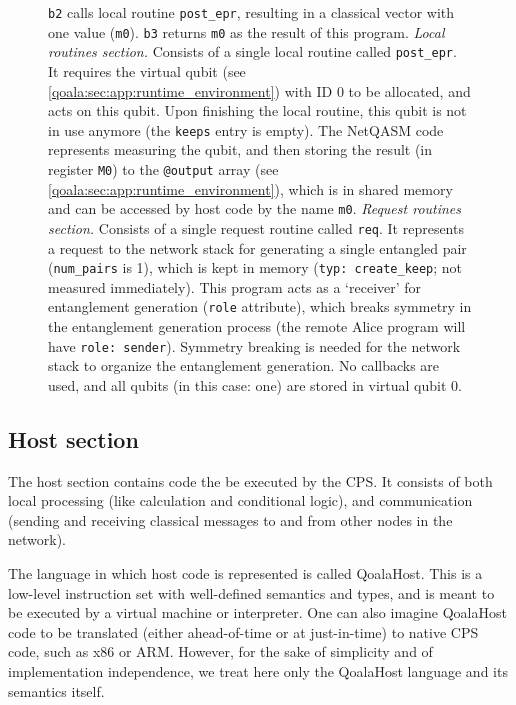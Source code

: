 \begin{figure}[ht]
{    \texttt{b2} calls local routine \texttt{post\_epr}, resulting in a classical vector with one value (\texttt{m0}).
    \texttt{b3} returns \texttt{m0} as the result of this program.
    \textit{Local routines section.} Consists of a single local routine called \texttt{post\_epr}.
    It requires the virtual qubit (see \cref{qoala:sec:app:runtime_environment}) with ID 0 to be allocated, and acts on this qubit.
    Upon finishing the local routine, this qubit is not in use anymore (the \texttt{keeps} entry is empty).
    The NetQASM code represents measuring the qubit, and then storing the result (in register \texttt{M0}) to the \texttt{@output} array (see \cref{qoala:sec:app:runtime_environment}), which is in shared memory and can be accessed by host code by the name \texttt{m0}.
    \textit{Request routines section.} Consists of a single request routine called \texttt{req}.
    It represents a request to the network stack for generating a single entangled pair (\texttt{num\_pairs} is 1), which is kept in memory (\texttt{typ: create\_keep}; not measured immediately).
    This program acts as a `receiver' for entanglement generation (\texttt{role} attribute), which breaks symmetry in the entanglement generation process (the remote Alice program will have \texttt{role: sender}). Symmetry breaking is needed for the network stack to organize the entanglement generation.
    No callbacks are used, and all qubits (in this case: one) are stored in virtual qubit 0.
    }
    \label{qoala:fig:app:example_full_program}
\end{figure}

\subsection{Host section}
The host section contains code the be executed by the CPS.
It consists of both local processing (like calculation and conditional logic), and
communication (sending and receiving classical messages to and from other nodes in the network).

The language in which host code is represented is called QoalaHost.
This is a low-level instruction set with well-defined semantics and types,
and is meant to be executed by a virtual machine or interpreter.
One can also imagine QoalaHost code to be translated (either ahead-of-time or at just-in-time) to native CPS code, such as x86 or ARM. However, for the sake of simplicity and of implementation independence, we treat here only the QoalaHost language and its semantics itself.

